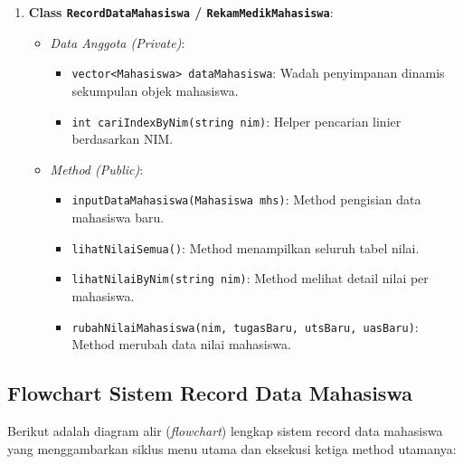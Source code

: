 \documentclass[12pt,a4paper]{article}
\begin{document}
\begin{enumerate}
    \item \textbf{Class \texttt{RecordDataMahasiswa} / \texttt{RekamMedikMahasiswa}}:
    \begin{itemize}
        \item \textit{Data Anggota (Private)}:
        \begin{itemize}
            \item \texttt{vector<Mahasiswa> dataMahasiswa}: Wadah penyimpanan dinamis sekumpulan objek mahasiswa.
            \item \texttt{int cariIndexByNim(string nim)}: Helper pencarian linier berdasarkan NIM.
        \end{itemize}
        \item \textit{Method (Public)}:
        \begin{itemize}
            \item \texttt{inputDataMahasiswa(Mahasiswa mhs)}: Method pengisian data mahasiswa baru.
            \item \texttt{lihatNilaiSemua()}: Method menampilkan seluruh tabel nilai.
            \item \texttt{lihatNilaiByNim(string nim)}: Method melihat detail nilai per mahasiswa.
            \item \texttt{rubahNilaiMahasiswa(nim, tugasBaru, utsBaru, uasBaru)}: Method merubah data nilai mahasiswa.
        \end{itemize}
    \end{itemize}
\end{enumerate}

\subsection{Flowchart Sistem Record Data Mahasiswa}
Berikut adalah diagram alir (\textit{flowchart}) lengkap sistem record data mahasiswa yang menggambarkan siklus menu utama dan eksekusi ketiga method utamanya:
\end{document}
